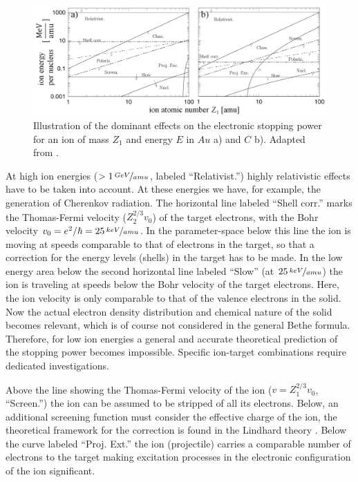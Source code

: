 \begin{figure}[h]
	\centering
		\includegraphics[width=.99\textwidth]{images/StoppinginAuandC.png}
	\caption{Illustration of the dominant effects on the electronic stopping power for an ion of mass $Z_1$ and energy $E$ in $Au$ a) and $C$ b). Adapted from \cite{sigmund_stopping_2004}.} 
	\label{stopping}
\end{figure} 


At high ion energies ($ > 1\,\nicefrac{GeV}{amu}$, labeled ``Relativist.'') highly relativistic effects have to be taken into account. At these energies we have, for example, the generation of Cherenkov radiation. The horizontal line labeled ``Shell corr.'' marks the Thomas-Fermi velocity ($Z_2^{2/3}v_0$) of the target electrons, with the Bohr velocity $v_0 = e^2/\hbar = 25\,\nicefrac{keV}{amu}$. In the parameter-space below this line the ion is moving at speeds comparable to that of electrons in the target, so that a correction for the energy levels (shells) in the target has to be made. In the low energy area below the second horizontal line labeled ``Slow'' (at $25\,\nicefrac{keV}{amu}$) the ion is traveling at speeds below the Bohr velocity of the target electrons. Here, the ion velocity is only comparable to that of the valence electrons in the solid. Now the actual electron density distribution and chemical nature of the solid becomes relevant, which is of course not considered in the general Bethe formula. Therefore, for low ion energies a general and accurate theoretical prediction of the stopping power becomes impossible. Specific ion-target combinations require dedicated investigations.

Above the line showing the Thomas-Fermi velocity of the ion ($v = Z_1^{2/3}v_0$, ``Screen.'') the ion can be assumed to be stripped of all its electrons. Below, an additional screening function must consider the effective charge of the ion, the theoretical framework for the correction is found in the Lindhard theory \cite{lindhard_properties_1954}. Below the curve labeled ``Proj. Ext.'' the ion (projectile) carries a comparable number of electrons to the target making excitation processes in the electronic configuration of the ion significant.

